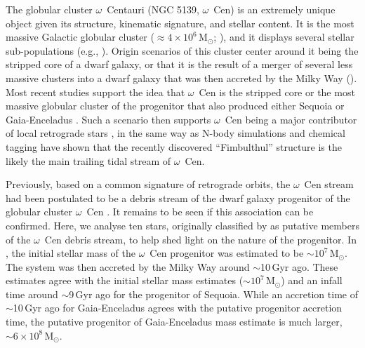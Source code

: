 \documentclass[twocolumn]{aastex63}
\begin{document}
The globular cluster $\omega$~Centauri (NGC 5139, $\omega$~Cen) is an extremely unique object given its structure, kinematic signature, and stellar content. It is the most massive Galactic globular cluster ($\approx 4 \times 10^{6}$\,M$_{\odot}$; \citealt{dsouza13}), and it displays several stellar sub-populations (e.g., \citealt{gratton11,bellini17}). Origin scenarios of this cluster center around it being the stripped core of a dwarf galaxy, or that it is the result of a merger of several less massive clusters into a dwarf galaxy that was then accreted by the Milky Way (\citealt{norris97, bekki03, deboer15}). Most recent studies support the idea that $\omega$~Cen is the stripped core or the most massive globular cluster of the progenitor that also produced either Sequoia \citep{myeong19} or Gaia-Enceladus \citep{massari19}. Such a scenario then supports $\omega$~Cen being a major contributor of local retrograde stars \citep{majewski12}, in the same way as  N-body simulations \citep{Ibata19} and chemical tagging \citep{simpson20} have shown that the recently discovered ``Fimbulthul'' structure is the likely the main trailing tidal stream of $\omega$~Cen. 

Previously, based on a common signature of retrograde orbits, the $\omega$~Cen stream had been postulated to be a debris stream of the dwarf galaxy progenitor of the globular cluster $\omega$~Cen \citep{dinescu02, beers17}. It remains to be seen if this association can be confirmed. Here, we analyse ten stars, originally classified by \citet{beers17} as putative members of the $\omega$~Cen debris stream, to help shed light on the nature of the progenitor. In \citet{bekki03}, the initial stellar mass of the  $\omega$~Cen progenitor was estimated to be $\sim10^7$\,M$_\odot$. The system was then accreted by the Milky Way around $\sim$10\,Gyr ago. These estimates agree with the initial stellar mass estimates ($\sim10^7$\,M$_\odot$) and an infall time around $\sim$9\,Gyr ago for the progenitor of Sequoia. While an accretion time of $\sim$10\,Gyr ago for Gaia-Enceladus agrees with the putative progenitor accretion time, the putative progenitor of Gaia-Enceladus mass estimate is much larger, $\sim6\times10^8$\,M$_\odot$.


 
\end{document}
